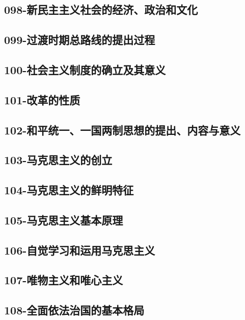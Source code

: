 \subsection{098-新民主主义社会的经济、政治和文化}

\subsection{099-过渡时期总路线的提出过程}

\subsection{100-社会主义制度的确立及其意义}

\subsection{101-改革的性质}

\subsection{102-和平统一、一国两制思想的提出、内容与意义}

\subsection{103-马克思主义的创立}

\subsection{104-马克思主义的鲜明特征}

\subsection{105-马克思主义基本原理}

\subsection{106-自觉学习和运用马克思主义}

\subsection{107-唯物主义和唯心主义}

\subsection{108-全面依法治国的基本格局}

